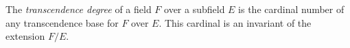 The \emph{transcendence degree} of a field $F$ over a subfield $E$ is the cardinal number of any transcendence base for $F$ over $E$. This cardinal is an invariant of the extension $F/E$.